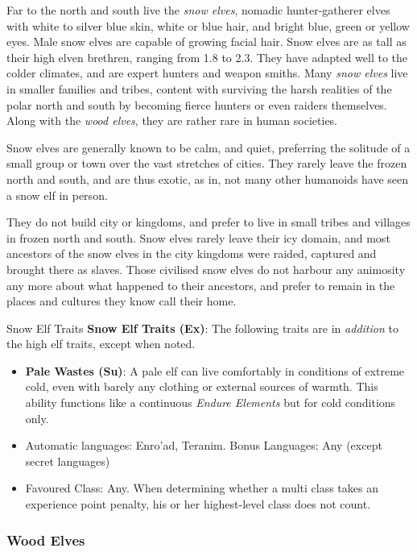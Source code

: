 Far to the north and south live the \emph{snow elves}, nomadic hunter-gatherer
elves with white to silver blue skin, white or blue hair, and bright blue,
green or yellow eyes. Male snow elves are capable of growing facial hair. Snow
elves are as tall as their high elven brethren, ranging from 1.8 to 2.3. They
have adapted well to the colder climates, and are expert hunters and weapon
smiths. Many \emph{snow elves} live in smaller families and tribes, content
with surviving the harsh realities of the polar north and south by becoming
fierce hunters or even raiders themselves. Along with the
\emph{wood elves}, they are rather rare in human societies.

Snow elves are generally known to be calm, and quiet, preferring the solitude
of a small group or town over the vast stretches of cities. They rarely leave
the frozen north and south, and are thus exotic, as in, not many other
humanoids have seen a snow elf in person.

They do not build city or kingdoms, and prefer to live in small tribes and
villages in frozen north and south. Snow elves rarely leave their icy domain,
and most ancestors of the snow elves in the city kingdoms were raided,
captured and brought there as slaves. Those civilised snow elves do not
harbour any animosity any more about what happened to their ancestors, and
prefer to remain in the places and cultures they know call their home.

\begin{35e}{Snow Elf Traits}
  \textbf{Snow Elf Traits (Ex)}: The following traits are in \emph{addition}
  to the high elf traits, except when noted.
  \begin{itemize}[noitemsep]
    \item \textbf{Pale Wastes (Su)}: A pale elf can live comfortably in
    conditions of extreme cold, even with barely any clothing or external
    sources of warmth. This ability functions like a continuous \emph{Endure
    Elements} but for cold conditions only.
    \item Automatic languages: Enro'ad, Teranim. Bonus Languages: Any (except
      secret languages)
    \item Favoured Class: Any. When determining whether a multi class takes an
    experience point penalty, his or her highest-level class does not count.
  \end{itemize}
\end{35e}

\subsubsection*{Wood Elves}
\label{sec:Wood Elves}

